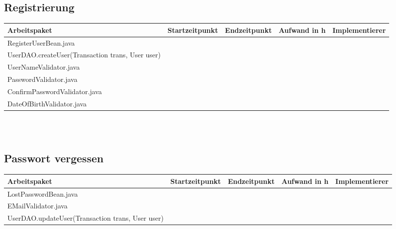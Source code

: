 \documentclass[12pt,a4paper]{scrreprt}
\begin{document}
\begin{landscape}
   	\subsection{Registrierung}
   	\begin{tabular}{|p{10cm}|p{4cm}|p{3cm}|p{3cm}|p{3cm}|}
   		\hline  \textbf{Arbeitspaket} & \textbf{Startzeitpunkt} & \textbf{Endzeitpunkt} & \textbf{Aufwand in h} & \textbf{Implementierer} \\ 
   		\hline   RegisterUserBean.java                                &                            &                             &                     &\\
   		\hline   UserDAO.createUser(Transaction trans, User user)     &                            &                             &                     &\\ 
   		\hline   UserNameValidator.java                               &                            &                             &                     &\\ 
   		\hline   PasswordValidator.java                               &                            &                             &                     &\\ 
   		\hline   ConfirmPasswordValidator.java                        &                            &                             &                     &\\
   		\hline   DateOfBirthValidator.java                            &                            &                             &                     &\\
   		\hline 
   	\end{tabular} \ \\
   	\ \\
   	
   	\subsection{Passwort vergessen}
   	\begin{tabular}{|p{10cm}|p{4cm}|p{3cm}|p{3cm}|p{3cm}|}
   		\hline  \textbf{Arbeitspaket} & \textbf{Startzeitpunkt} & \textbf{Endzeitpunkt} & \textbf{Aufwand in h} & \textbf{Implementierer} \\ 
   		\hline   LostPasswordBean.java                                &                            &                             &                     &\\
   		\hline   EMailValidator.java                                  &                            &                             &                     &\\ 
   		\hline   UserDAO.updateUser(Transaction trans, User user)     &                            &                             &                     &\\ 
   		\hline 
   	\end{tabular} \ \\
   	\ \\
   	

\end{landscape}
\end{document}
